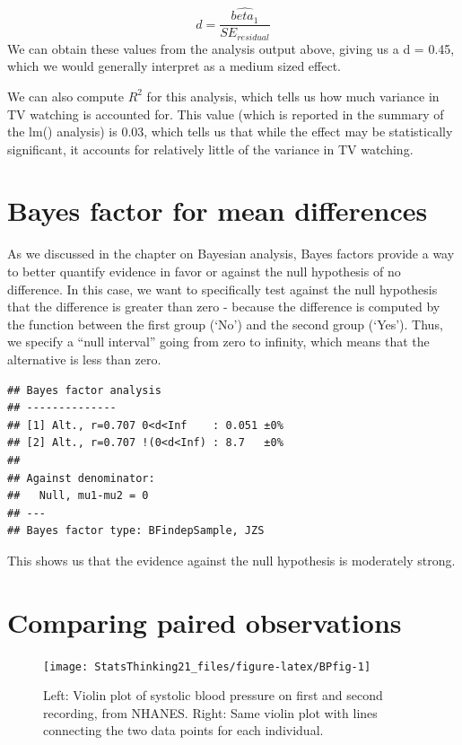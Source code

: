 \documentclass[12pt,]{book}
\theoremstyle{definition}
\theoremstyle{definition}
\theoremstyle{definition}
\theoremstyle{remark}
\begin{document}
\[
d = \frac{\hat{beta_1}}{SE_{residual}}
\]
We can obtain these values from the analysis output above, giving us a d = 0.45, which we would generally interpret as a medium sized effect.

We can also compute \(R^2\) for this analysis, which tells us how much variance in TV watching is accounted for. This value (which is reported in the summary of the lm() analysis) is 0.03, which tells us that while the effect may be statistically significant, it accounts for relatively little of the variance in TV watching.

\hypertarget{bayes-factor-for-mean-differences}{%
\section{Bayes factor for mean differences}\label{bayes-factor-for-mean-differences}}

As we discussed in the chapter on Bayesian analysis, Bayes factors provide a way to better quantify evidence in favor or against the null hypothesis of no difference. In this case, we want to specifically test against the null hypothesis that the difference is greater than zero - because the difference is computed by the function between the first group (`No') and the second group (`Yes'). Thus, we specify a ``null interval'' going from zero to infinity, which means that the alternative is less than zero.

\begin{verbatim}
## Bayes factor analysis
## --------------
## [1] Alt., r=0.707 0<d<Inf    : 0.051 ±0%
## [2] Alt., r=0.707 !(0<d<Inf) : 8.7   ±0%
## 
## Against denominator:
##   Null, mu1-mu2 = 0 
## ---
## Bayes factor type: BFindepSample, JZS
\end{verbatim}

This shows us that the evidence against the null hypothesis is moderately strong.

\hypertarget{paired-ttests}{%
\section{Comparing paired observations}\label{paired-ttests}}

\begin{figure}
\texttt{[image: StatsThinking21\_files/figure-latex/BPfig-1]} \caption{Left: Violin plot of systolic blood pressure on first and second recording, from NHANES. Right: Same violin plot with lines connecting the two data points for each individual.}\label{fig:BPfig}
\end{figure}
\end{document}
